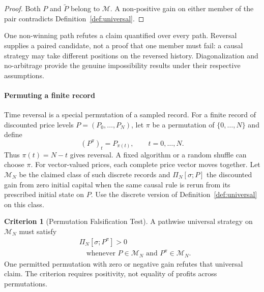 \documentclass[aps,pra,reprint,superscriptaddress,amsmath,amssymb,floatfix]{revtex4-2}
\theoremstyle{plain}
\theoremstyle{definition}
\newtheorem{criterion}{Criterion}
\theoremstyle{remark}
\begin{document}
\begin{proof}
Both \(P\) and \(\widetilde P\) belong to \(\mathcal{M}\). A non-positive gain
on either member of the pair contradicts Definition~\ref{def:universal}.
\end{proof}

One non-winning path refutes a claim quantified over every path. Reversal
supplies a paired candidate, not a proof that one member must fail: a causal
strategy may take different positions on the reversed history.
Diagonalization and no-arbitrage provide the genuine impossibility results
under their respective assumptions.

\paragraph{Permuting a finite record}

Time reversal is a special permutation of a sampled record. For a finite
record of discounted price levels \(P=(P_0,\ldots,P_N)\), let \(\pi\) be
a permutation of \(\{0,\ldots,N\}\) and define
\begin{equation}
  (P^\pi)_t=P_{\pi(t)},\qquad t=0,\ldots,N.
  \label{eq:price-permutation}
\end{equation}
Thus \(\pi(t)=N-t\) gives reversal. A fixed algorithm or a random shuffle
can choose \(\pi\). For vector-valued prices, each complete price vector
moves together. Let \(\mathcal M_N\) be the claimed class of such discrete
records and \(\Pi_N[\sigma;P]\) the discounted gain from zero initial capital
when the same causal rule is rerun from its prescribed initial state on \(P\).
Use the discrete version of Definition~\ref{def:universal} on this class.

\begin{criterion}[Permutation Falsification Test]
  \label{crit:permutation}
  A pathwise universal strategy on \(\mathcal M_N\) must satisfy
  \begin{equation}
    \begin{aligned}
      &\Pi_N[\sigma;P^\pi]>0\\
      &\quad\text{whenever }P\in\mathcal M_N\text{ and }P^\pi\in\mathcal M_N.
    \end{aligned}
    \label{eq:permutationtest}
  \end{equation}
  One permitted permutation with zero or negative gain refutes that universal
  claim. The criterion requires positivity, not equality of profits across
  permutations.
\end{criterion}
\end{document}
